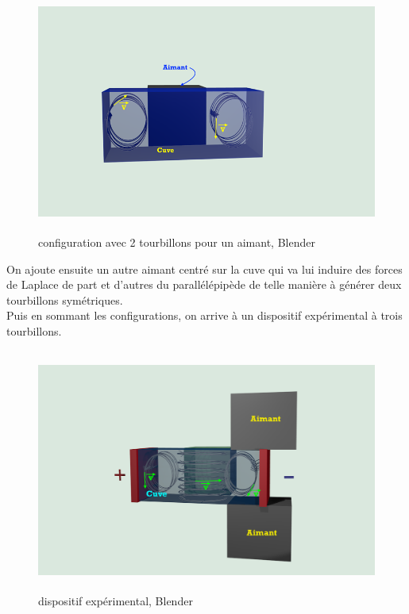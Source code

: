 \documentclass[a4paper,12pt,titlepage]{report}
\begin{document}
\begin{onehalfspace}
\begin{figure}[!h]
\begin{center}
		\includegraphics[height = 8cm, keepaspectratio]{graphes/config_centre.png} 
		\caption{configuration avec 2 tourbillons pour un aimant, Blender}
	\end{center}
\end{figure}
On ajoute ensuite un autre aimant centré sur la cuve qui va lui induire des forces de Laplace de part et d'autres du parallélépipède de telle manière à générer deux tourbillons symétriques.\\
Puis en sommant les configurations, on arrive à un dispositif expérimental à trois tourbillons. \\
\begin{figure}[!h]
	\begin{center}
	\centering
		\includegraphics[height = 8cm, keepaspectratio]{graphes/blender_cuve_champvec3.png} 
		\caption{dispositif expérimental, Blender}
	\end{center}
\end{figure}
\\
\newpage
\newpage

\end{onehalfspace}
\end{document}
